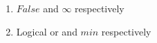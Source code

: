 \begin{enumerate}
    \item  $False$ and $\infty$ respectively
    \item Logical or and $min$ respectively
  \end{enumerate}

